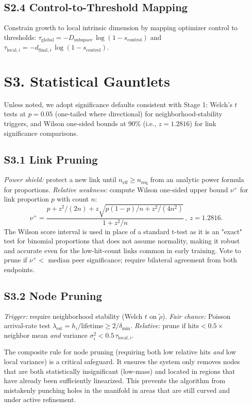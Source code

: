 \documentclass[11pt]{article}
\begin{document}
\subsection*{S2.4 Control-to-Threshold Mapping}
Constrain growth to local intrinsic dimension by mapping optimizer control to thresholds: $\tau_{\mathrm{global}}= -D_{\mathrm{subspace}}\,\log(1{-}s_{\mathrm{control}})$ and $\tau_{\mathrm{local},i}= -d_{\mathrm{final},i}\,\log(1{-}s_{\mathrm{control}})$.

\section*{S3. Statistical Gauntlets}
Unless noted, we adopt significance defaults consistent with Stage 1: Welch's $t$ tests at $p{=}0.05$ (one-tailed where directional) for neighborhood-stability triggers, and Wilson one-sided bounds at 90\% (i.e., $z{=}1.2816$) for link significance comparisons.
\subsection*{S3.1 Link Pruning}
\emph{Power shield:} protect a new link until $n_{\mathrm{eff}}\ge n_{\mathrm{req}}$ from an analytic power formula for proportions. \emph{Relative weakness:} compute Wilson one-sided upper bound $\nu^+$ for link proportion $p$ with count $n$:
\[\nu^+ = \frac{ p + z^2/(2n) + z\sqrt{p(1-p)/n + z^2/(4n^2)} }{1+z^2/n}\,,\ z{=}1.2816.\]
The Wilson score interval is used in place of a standard t-test as it is an "exact" test for binomial proportions that does not assume normality, making it robust and accurate even for the low-hit-count links common in early training. Vote to prune if $\nu^+{<}$ median peer significance; require bilateral agreement from both endpoints.

\subsection*{S3.2 Node Pruning}
\emph{Trigger:} require neighborhood stability (Welch $t$ on $\tilde\rho$). \emph{Fair chance:} Poisson arrival-rate test $\lambda_{\mathrm{est}}=h_i/\text{lifetime} \ge 2/\delta_{\min}$. \emph{Relative:} prune if hits$<0.5\times$ neighbor mean \emph{and} variance $\sigma_i^2 < 0.5\,\tau_{\mathrm{local},i}$. 

The composite rule for node pruning (requiring both low relative hits \emph{and} low local variance) is a critical safeguard. It ensures the system only removes nodes that are both statistically insignificant (low-mass) and located in regions that have already been sufficiently linearized. This prevents the algorithm from mistakenly punching holes in the manifold in areas that are still curved and under active refinement.
\end{document}
